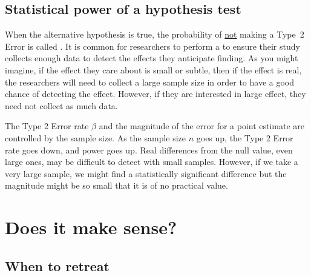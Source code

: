 

\subsection{Statistical power of a hypothesis test}

When the alternative hypothesis is true, the probability of \underline{not} making a Type~2 Error is called . It is common for researchers to perform a  to ensure their study collects enough data to detect the effects they anticipate finding. As you might imagine, if the effect they care about is small or subtle, then if the effect is real, the researchers will need to collect a large sample size in order to have a good chance of detecting the effect. However, if they are interested in large effect, they need not collect as much data.

The Type 2 Error rate $\beta$ and the magnitude of the error for a point estimate are controlled by the sample size. As the sample size $n$ goes up, the Type 2 Error rate goes down, and power goes up. Real differences from the null value, even large ones, may be difficult to detect with small samples. However, if we take a very large sample, we might find a statistically significant difference but the magnitude might be so small that it is of no practical value.




\section{Does it make sense?}
\subsection{When to retreat}
\label{whenToRetreat}

